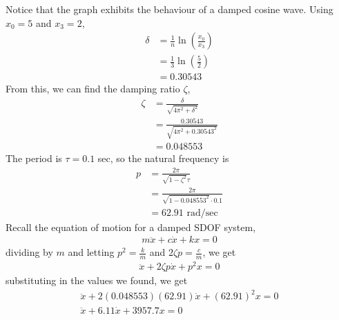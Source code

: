 Notice that the graph exhibits the behaviour of a damped cosine wave. Using $x_0= 5$ and $x_3 = 2$, 
\begin{align*}
    \delta &= \frac{1}{n} \ln\left(\frac{x_0}{x_3}\right) \\
    &= \frac{1}{3} \ln\left(\frac{5}{2}\right) \\
    &= 0.30543
\end{align*}
From this, we can find the damping ratio $\zeta$,
\begin{align*}
    \zeta &= \frac{\delta}{\sqrt{4\pi^2 + \delta^2}} \\
    &= \frac{0.30543}{\sqrt{4\pi^2 + 0.30543^2}} \\
    &= 0.048553
\end{align*}
The period is $\tau = 0.1$ sec, so the natural frequency is 
\begin{align*}
    p &= \frac{2\pi}{\sqrt{1-\zeta^2} \tau} \\
    &= \frac{2\pi}{\sqrt{1-0.048553^2} \cdot 0.1} \\
    &= 62.91 \text{ rad/sec}
\end{align*}
Recall the equation of motion for a damped SDOF system,
\begin{align*}
    m\ddot{x} + c\dot{x} + kx = 0
\end{align*}
dividing by $m$ and letting $p^2 = \frac{k}{m}$ and $2\zeta p = \frac{c}{m}$, we get
\begin{align*}
    \ddot{x} + 2\zeta p\dot{x} + p^2x = 0
\end{align*}
substituting in the values we found, we get
\begin{gather*}
    \ddot{x} + 2(0.048553)(62.91)\dot{x} + (62.91)^2x = 0 \\
    \boxed{\ddot{x} + 6.11\dot{x} + 3957.7x = 0}
\end{gather*}

